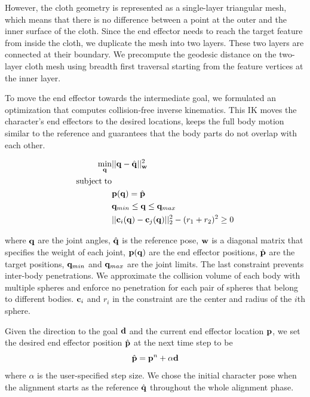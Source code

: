 However, the cloth geometry is represented as a single-layer triangular mesh, which means that there is no difference between a point at the outer and the inner surface of the cloth. Since the end effector needs to reach the target feature from inside the cloth, we duplicate the mesh into two layers. These two layers are connected at their boundary. We precompute the geodesic distance on the two-layer cloth mesh using breadth first traversal starting from the feature vertices at the inner layer.

To move the end effector towards the intermediate goal, we formulated an optimization that computes collision-free inverse kinematics. This IK moves the character's end effectors to the desired locations, keeps the full body motion similar to the reference and guarantees that the body parts do not overlap with each other.

\begin{align}
\label{eq:IK}
  \min_{\mathbf{q}} & ||\mathbf{q} - \hat{\mathbf{q}}||_{\mathbf{w}}^2 \\
  \nonumber  \mathrm{subject\;} \mathrm{to} & \\
  \nonumber  &\mathbf{p}(\mathbf{q}) = \hat{\mathbf{p}}\\
  \nonumber   &\mathbf{q}_{min} \leq \mathbf{q} \leq \mathbf{q}_{max}\\
  \nonumber   &||\mathbf{c}_i(\mathbf{q}) - \mathbf{c}_j(\mathbf{q})||_2^2 - (r_1 + r_2)^2 \geq 0
\end{align}

where $\mathbf{q}$ are the joint angles, $\hat{\mathbf{q}}$ is the reference pose, $\mathbf{w}$ is a diagonal matrix that specifies the weight of each joint, $\mathbf{p}(\mathbf{q})$ are the end effector positions, $\hat{\mathbf{p}}$ are the target positions, $\mathbf{q}_{min}$ and $\mathbf{q}_{max}$ are the joint limits. The last constraint prevents inter-body penetrations. We approximate the collision volume of each body with multiple spheres and enforce no penetration for each pair of spheres that belong to different bodies. $\mathbf{c}_i$ and $r_i$ in the constraint are the center and radius of the $i$th sphere.

Given the direction to the goal $\mathbf{d}$ and the current end effector location $\mathbf{p}$, we set the desired end effector position $\hat{\mathbf{p}}$ at the next time step to be
\begin{equation}
  \hat{\mathbf{p}} = \mathbf{p}^n+\alpha\mathbf{d}
  \label{eq:target}
\end{equation}
where $\alpha$ is the user-specified step size.  We chose the initial character pose when the alignment starts as the reference $\hat{\mathbf{q}}$ throughout the whole alignment phase.

